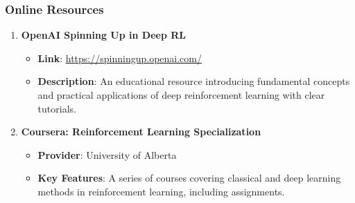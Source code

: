 \documentclass[aspectratio=169]{beamer}
\begin{document}
\begin{frame}[fragile]
    \frametitle{Online Resources}
    \begin{enumerate}
        \item \textbf{OpenAI Spinning Up in Deep RL}
        \begin{itemize}
            \item \textbf{Link}: \url{https://spinningup.openai.com/}
            \item \textbf{Description}: An educational resource introducing fundamental concepts and practical applications of deep reinforcement learning with clear tutorials.
        \end{itemize}
        
        \item \textbf{Coursera: Reinforcement Learning Specialization}
        \begin{itemize}
            \item \textbf{Provider}: University of Alberta
            \item \textbf{Key Features}: A series of courses covering classical and deep learning methods in reinforcement learning, including assignments.
        \end{itemize}
    \end{enumerate}
\end{frame}
\end{document}
